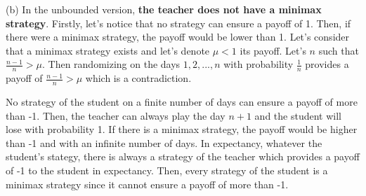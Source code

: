 \documentclass[11pt, a4paper]{article}
\begin{document}
(b) In the unbounded version, \textbf{the teacher does not have a minimax strategy}. Firstly, let's notice that no strategy can ensure a payoff of 1.
Then, if there were a minimax strategy, the payoff would be lower than 1.
Let's consider that a minimax strategy exists and let's denote $\mu < 1$ its payoff. Let's $n$ such that $\frac{n-1}{n}> \mu$. Then randomizing 
on the days $1, 2, ..., n$ with probability $\frac{1}{n}$ provides a payoff of $\frac{n-1}{n} > \mu$ which is a contradiction.


No strategy of the student on a finite number of days can ensure a payoff of more than -1. 
Then, the teacher can always play the day $n+1$ and the student will lose with probability 1.
If there is a minimax strategy, the payoff would be higher than -1 and with an infinite number of days.
In expectancy, whatever the student's stategy, there is always a strategy of the teacher which provides a payoff of -1 to the student in expectancy.
Then, every strategy of the student is a minimax strategy since it cannot ensure a payoff of more than -1.
\end{document}
